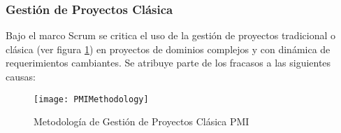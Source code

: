 \subsubsection{Gestión de Proyectos Clásica}

Bajo el marco Scrum se critica el uso de la gestión de proyectos tradicional o clásica (ver figura \ref{fig:PMIMethodology}) en proyectos de dominios complejos y con dinámica de requerimientos cambiantes. Se atribuye parte de los fracasos a las siguientes causas:

\begin{figure}[h]
  \centering
  \texttt{[image: PMIMethodology]}
  \caption{Metodología de Gestión de Proyectos Clásica PMI}
  \centering
  \label{fig:PMIMethodology} %
\end{figure}

